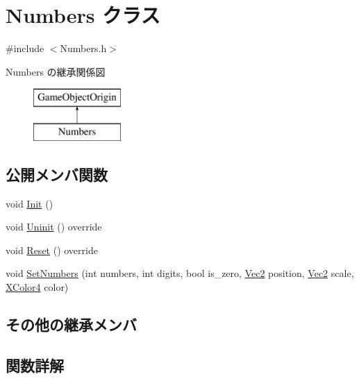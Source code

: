\hypertarget{class_numbers}{}\section{Numbers クラス}
\label{class_numbers}


{\ttfamily \#include $<$Numbers.\+h$>$}

Numbers の継承関係図\begin{figure}[H]
\begin{center}
\leavevmode
\includegraphics[height=2.000000cm]{class_numbers}
\end{center}
\end{figure}
\subsection*{公開メンバ関数}
\begin{DoxyCompactItemize}
\item 
void \mbox{\hyperlink{class_numbers_a42158aa8dbb71308161c642aed8752e8}{Init}} ()
\item 
void \mbox{\hyperlink{class_numbers_aeaad3cc1b8ae7defe79813b983b04101}{Uninit}} () override
\item 
void \mbox{\hyperlink{class_numbers_a1ab67e439ba1695c8fd545dfc1650990}{Reset}} () override
\item 
void \mbox{\hyperlink{class_numbers_aeb51ecf4e148f4ca67ac7788e061f94d}{Set\+Numbers}} (int numbers, int digits, bool is\+\_\+zero, \mbox{\hyperlink{_vector3_d_8h_a5ef6e95dfc5f9d3820b71772d99bbc25}{Vec2}} position, \mbox{\hyperlink{_vector3_d_8h_a5ef6e95dfc5f9d3820b71772d99bbc25}{Vec2}} scale, \mbox{\hyperlink{_vector3_d_8h_a680c30c4a07d86fe763c7e01169cd6cc}{X\+Color4}} color)
\end{DoxyCompactItemize}
\subsection*{その他の継承メンバ}


\subsection{関数詳解}
\mbox{\label{class_numbers_a42158aa8dbb71308161c642aed8752e8}} 
